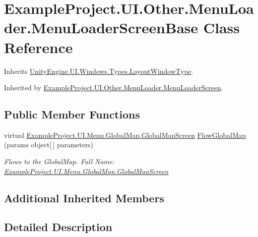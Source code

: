 \hypertarget{class_example_project_1_1_u_i_1_1_other_1_1_menu_loader_1_1_menu_loader_screen_base}{}\section{Example\+Project.\+U\+I.\+Other.\+Menu\+Loader.\+Menu\+Loader\+Screen\+Base Class Reference}
\label{class_example_project_1_1_u_i_1_1_other_1_1_menu_loader_1_1_menu_loader_screen_base}


Inherits \hyperlink{class_unity_engine_1_1_u_i_1_1_windows_1_1_types_1_1_layout_window_type}{Unity\+Engine.\+U\+I.\+Windows.\+Types.\+Layout\+Window\+Type}.



Inherited by \hyperlink{class_example_project_1_1_u_i_1_1_other_1_1_menu_loader_1_1_menu_loader_screen}{Example\+Project.\+U\+I.\+Other.\+Menu\+Loader.\+Menu\+Loader\+Screen}.

\subsection*{Public Member Functions}
\begin{DoxyCompactItemize}
\item 
virtual \hyperlink{class_example_project_1_1_u_i_1_1_menu_1_1_global_map_1_1_global_map_screen}{Example\+Project.\+U\+I.\+Menu.\+Global\+Map.\+Global\+Map\+Screen} \hyperlink{class_example_project_1_1_u_i_1_1_other_1_1_menu_loader_1_1_menu_loader_screen_base_a83d80845dcbae5ed3acc8f417be3bfec}{Flow\+Global\+Map} (params object\mbox{[}$\,$\mbox{]} parameters)
\begin{DoxyCompactList}\small\item\em Flows to the Global\+Map. Full Name\+: \hyperlink{class_example_project_1_1_u_i_1_1_menu_1_1_global_map_1_1_global_map_screen}{Example\+Project.\+U\+I.\+Menu.\+Global\+Map.\+Global\+Map\+Screen} \end{DoxyCompactList}\end{DoxyCompactItemize}
\subsection*{Additional Inherited Members}


\subsection{Detailed Description}


